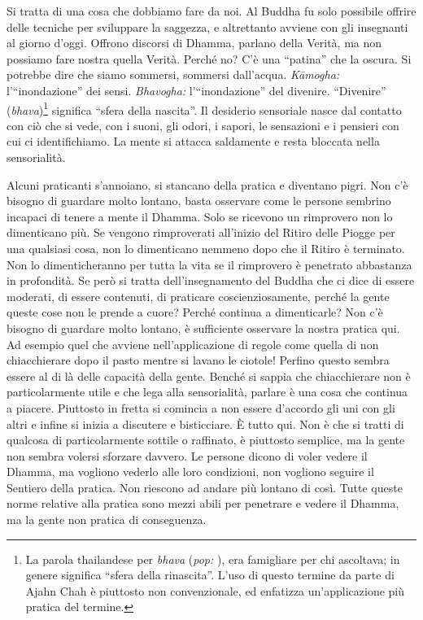 Si tratta di una cosa che dobbiamo fare da noi. Al Buddha fu solo
possibile offrire delle tecniche per sviluppare la saggezza, e
altrettanto avviene con gli insegnanti al giorno d'oggi. Offrono
discorsi di Dhamma, parlano della Verità, ma non possiamo fare nostra
quella Verità. Perché no? C'è una ``patina'' che la oscura. Si potrebbe
dire che siamo sommersi, sommersi dall'acqua. \emph{Kāmogha:}
l'``inondazione'' dei sensi. \emph{Bhavogha:} l'``inondazione'' del
divenire. ``Divenire'' (\emph{bhava})\footnote{La parola thailandese per
  \emph{bhava} (\emph{pop:} ), era famigliare per chi
  ascoltava; in genere significa ``sfera della rinascita''. L'uso di
  questo termine da parte di Ajahn Chah è piuttosto non convenzionale,
  ed enfatizza un'applicazione più pratica del termine.} significa
``sfera della nascita''. Il desiderio sensoriale nasce dal contatto con
ciò che si vede, con i suoni, gli odori, i sapori, le sensazioni e i
pensieri con cui ci identifichiamo. La mente si attacca saldamente e
resta bloccata nella sensorialità.

Alcuni praticanti s'annoiano, si stancano della pratica e diventano
pigri. Non c'è bisogno di guardare molto lontano, basta osservare come
le persone sembrino incapaci di tenere a mente il Dhamma. Solo se
ricevono un rimprovero non lo dimenticano più. Se vengono rimproverati
all'inizio del Ritiro delle Piogge per una qualsiasi cosa, non lo
dimenticano nemmeno dopo che il Ritiro è terminato. Non lo
dimenticheranno per tutta la vita se il rimprovero è penetrato
abbastanza in profondità. Se però si tratta dell'insegnamento del Buddha
che ci dice di essere moderati, di essere contenuti, di praticare
coscienziosamente, perché la gente queste cose non le prende a cuore?
Perché continua a dimenticarle? Non c'è bisogno di guardare molto
lontano, è sufficiente osservare la nostra pratica qui. Ad esempio quel
che avviene nell'applicazione di regole come quella di non chiacchierare
dopo il pasto mentre si lavano le ciotole! Perfino questo sembra essere
al di là delle capacità della gente. Benché si sappia che chiacchierare
non è particolarmente utile e che lega alla sensorialità, parlare è una
cosa che continua a piacere. Piuttosto in fretta si comincia a non
essere d'accordo gli uni con gli altri e infine si inizia a discutere e
bisticciare. È tutto qui. Non è che si tratti di qualcosa di
particolarmente sottile o raffinato, è piuttosto semplice, ma la gente
non sembra volersi sforzare davvero. Le persone dicono di voler vedere
il Dhamma, ma vogliono vederlo alle loro condizioni, non vogliono
seguire il Sentiero della pratica. Non riescono ad andare più lontano di
così. Tutte queste norme relative alla pratica sono mezzi abili per
penetrare e vedere il Dhamma, ma la gente non pratica di conseguenza.

